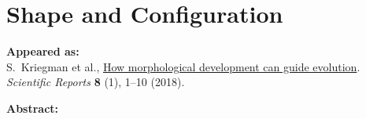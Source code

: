 

\chapter{Shape and Configuration}

\textbf{Appeared as:}\\
S.~Kriegman et al., \href{https://www.nature.com/articles/s41598-018-31868-7}{\color{blue}How morphological development can guide evolution}. \textit{Scientific Reports} \textbf{8} (1), 1--10 (2018).

\vspace{1em}

\noindent
\textbf{Abstract:}\\















